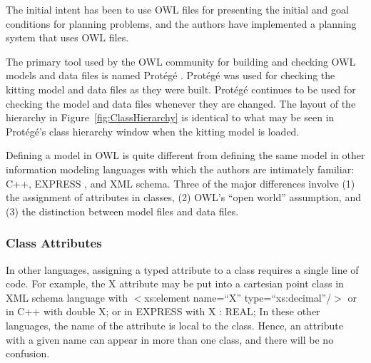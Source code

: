 The initial intent has been to use OWL files for presenting the initial and
goal conditions for planning problems, and the authors have implemented a
planning system that uses OWL files.

The primary tool used by the OWL community for building and checking OWL
models and data files is named Prot\'{e}g\'{e} \cite{Horridge.2011}.  Prot\'{e}g\'{e} was
used for checking the kitting model and data files as they were
built.  Prot\'{e}g\'{e} continues to be used for checking the model and data files
whenever they are changed. The layout of the hierarchy in
Figure~\ref{fig:ClassHierarchy} is identical to what may be seen in
 Prot\'{e}g\'{e}'s class hierarchy window when the kitting model is loaded.

Defining a model in OWL is quite different from defining the same model in
other information modeling languages with which the authors are intimately
familiar: C++, EXPRESS \cite{EXPRESSmanual}, and XML schema. Three of the
major differences involve (1) the assignment of attributes in classes, (2)
OWL's ``open world'' assumption, and (3) the distinction between model
files and data files.\\

\subsubsection{Class Attributes}
In other languages, assigning a typed attribute to a class requires a
single line of code. For example, the X attribute may be put into a
cartesian point class in XML schema language with
\newline \sf $<$xs:element name=``X'' type=``xs:decimal''/$>$\rm
\newline or in C++ with
\newline \sf double X; \rm
\newline or in EXPRESS with
\newline \sf X : REAL; \rm \newline
In these other languages, the name of the attribute is local to the class.
Hence, an attribute with a given name can appear in more than one class, and
there will be no confusion.

